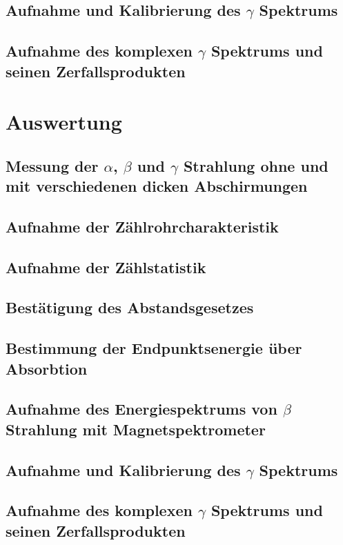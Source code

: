 \documentclass[12pt,english,ngerman]{scrartcl}
\begin{document}

\subsection{Aufnahme und Kalibrierung des \texorpdfstring{$\gamma$}{gamma} Spektrums}


\subsection{Aufnahme des komplexen \texorpdfstring{$\gamma$}{gamma} Spektrums und seinen Zerfallsprodukten}








\section{Auswertung}\label{sec:Auswertung}

\subsection{Messung der \texorpdfstring{$\alpha$}{alpha}, \texorpdfstring{$\beta$}{beta} und \texorpdfstring{$\gamma$}{gamma} Strahlung ohne und mit verschiedenen dicken Abschirmungen}



\subsection{Aufnahme der Zählrohrcharakteristik}




\subsection{Aufnahme der Zählstatistik}


\subsection{Bestätigung des Abstandsgesetzes}


\subsection{Bestimmung der Endpunktsenergie über Absorbtion}


\subsection{Aufnahme des Energiespektrums von \texorpdfstring{$\beta$}{beta} Strahlung mit Magnetspektrometer}


\subsection{Aufnahme und Kalibrierung des \texorpdfstring{$\gamma$}{gamma} Spektrums}


\subsection{Aufnahme des komplexen \texorpdfstring{$\gamma$}{gamma} Spektrums und seinen Zerfallsprodukten}



\newpage

\printbibliography
\listoffigures
\listoftables
\end{document}
